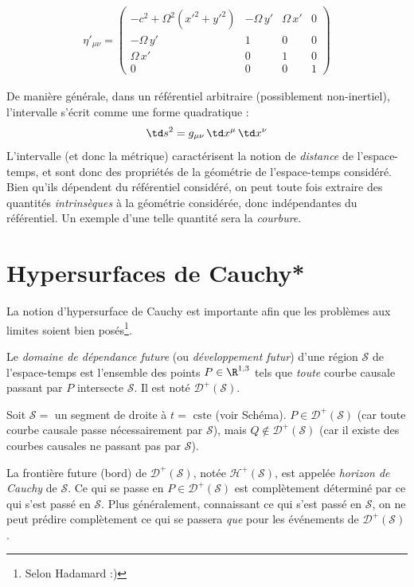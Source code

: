 {\begin{exmp}
\begin{align}
        \eta'_{\mu\nu} = \begin{pmatrix}
            - c^2 + \Omega^2 (x'^2 + y'^2) & - \Omega \, y' & \Omega \, x' & 0 \\
            - \Omega \, y' & 1 & 0 & 0\\
            \Omega \, x' & 0 & 1 & 0\\
            0 & 0 & 0 & 1
        \end{pmatrix}
    \end{align}
\end{exmp}
\cutebreak
De manière générale, dans un référentiel arbitraire (possiblement non-inertiel), l'intervalle s'écrit comme une forme quadratique :
\begin{equation}
    \td s^2 = g_{\mu\nu}\, \td x^\mu \, \td x^\nu
\end{equation}
L'intervalle (et donc la métrique) caractérisent la notion de \emph{distance} de l'espace-temps, et sont donc des propriétés de la géométrie de l'espace-temps considéré. Bien qu'ils dépendent du référentiel considéré, on peut toute fois extraire des quantités \emph{intrinsèques} à la géométrie considérée, donc indépendantes du référentiel. Un exemple d'une telle quantité sera la \emph{courbure}. 
\section{Hypersurfaces de Cauchy*}
La notion d'hypersurface de Cauchy est importante afin que les problèmes aux limites soient bien posés\footnote{Selon Hadamard :)}.

\begin{theoremframe}
    \begin{defi}
        Le \textit{domaine de dépendance future} (ou \textit{développement futur}) d'une région $\mathcal{S}$ de l'espace-temps est l'ensemble des points $P \in \R^{1,3}$ tels que \emph{toute} courbe causale passant par $P$ intersecte $\mathcal{S}$. Il est noté $\mathcal{D}^+(\mathcal{S})$.
    \end{defi}
\end{theoremframe}
\begin{exmp}
    Soit $\mathcal{S} = $ un segment de droite à $t = \text{ cste}$ (voir Schéma). $P \in \mathcal{D}^+(\mathcal{S})$ (car toute courbe causale passe nécessairement par $\mathcal{S}$), mais $Q \notin \mathcal{D}^+(\mathcal{S})$ (car il existe des courbes causales ne passant pas par $\mathcal{S}$).
\end{exmp}
La frontière future (bord) de $\mathcal{D}^+(\mathcal{S})$, notée $\mathcal{H}^+(\mathcal{S})$, est appelée \emph{horizon de Cauchy} de $\mathcal{S}$. Ce qui se passe en $P \in \mathcal{D}^+(\mathcal{S})$ est complètement déterminé par ce qui s'est passé en $\mathcal{S}$. Plus généralement, connaissant ce qui s'est passé en $\mathcal{S}$, on ne peut prédire complètement ce qui se passera \emph{que} pour les événements de $\mathcal{D}^+(\mathcal{S})$.

}
